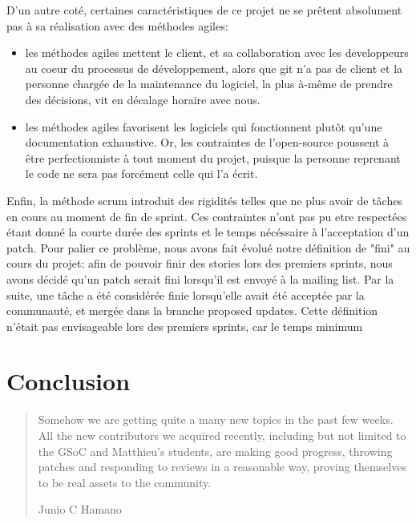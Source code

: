 \documentclass[a4paper, 12pt]{article}
\begin{document}
D'un autre coté, certaines caractéristiques de ce projet ne se prêtent absolument pas à sa réalisation avec des méthodes agiles:
\begin{itemize}
\item les méthodes agiles mettent le client, et sa collaboration avec les developpeurs au coeur du processus de développement, alors que git n'a pas de client et la personne chargée de la maintenance du logiciel, la plus à-même de prendre des décisions, vit en décalage horaire avec nous.
\item les méthodes agiles favorisent les logiciels qui fonctionnent plutôt qu'une documentation exhaustive.
Or, les contraintes de l'open-source poussent à être perfectionniste à tout moment du projet, puisque la personne reprenant le code ne sera pas forcément celle qui l'a écrit.
\end{itemize}

Enfin, la méthode scrum introduit des rigidités telles que ne plus avoir de tâches en cours au moment de fin de sprint.
Ces contraintes n'ont pas pu etre respectées étant donné la courte durée des sprints et le temps nécéssaire à l'acceptation d'un patch.
Pour palier ce problème, nous avons fait évolué notre définition de "fini" au cours du projet: afin de pouvoir finir des stories lors des premiers sprints, nous avons décidé qu'un patch serait fini lorsqu'il est envoyé à la mailing list.
Par la suite, une tâche a été considérée finie lorsqu'elle avait été acceptée par la communauté, et mergée dans la branche proposed updates.
Cette définition n'était pas envisageable lors des premiers sprints, car le temps minimum 

\section{Conclusion}

\begin{quote} 
   Somehow we are getting quite a many new topics in the past few
weeks.  All the new contributors we acquired recently, including but not limited to the GSoC and Matthieu's students, are making good progress, throwing patches and responding to reviews in a reasonable way, proving themselves to be real assets to the community.
   \begin{flushright}
      Junio C Hamano
   \end{flushright}
\end{quote}
\end{document}
